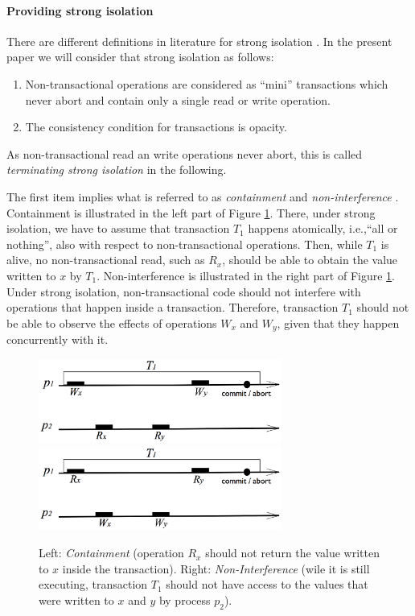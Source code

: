 \documentclass[11pt,letterpaper]{article}
\begin{document}
\paragraph{Providing strong isolation}
There  are different  definitions in  literature for  strong 
isolation \cite{blundell06, harris06, maessen07}.  
In the present  paper we  will consider that strong isolation as  follows:  
\begin{enumerate}
\vspace{-0.1cm}
\item   Non-transactional   operations   are   considered   as ``mini''
transactions which never abort and  contain only a single  read or 
write operation. 
\vspace{-0.2cm}
\item The consistency condition for transactions is opacity.
\end{enumerate}
As non-transactional read an write operations never abort, 
this is called {\it terminating strong isolation} in the following.





The  first   item   implies   what   is  referred  to  as  
{\it containment}  and
{\it non-interference} \cite{blundell06}.  
Containment is   illustrated in  the  left  part of  Figure
\ref{fig:int-nonc}.  There,
under strong  isolation, we have  to assume that transaction  $T_1$ happens
atomically,  
i.e.,``all  or  nothing'',   also  with  respect  to  non-transactional
operations. Then, while $T_1$ is  alive, no non-transactional read, such as
$R_x$, should be  
able to obtain  the value written to $x$  by $T_1$. Non-interference
is  illustrated  in  the right part of Figure  \ref{fig:int-nonc}.  
Under  strong  isolation, non-transactional  
code   should  not  interfere   with  operations   that  happen   inside  a
transaction. Therefore, transaction $T_1$ should not be able to observe the
effects of  
operations $W_x$ and $W_y$, given that they happen concurrently with it. 

\begin{figure}[h]
\centerline{
     \mbox{\includegraphics[width=80mm]{imgs/non_containment.eps}}
     \mbox{\includegraphics[width=80mm]{imgs/interference.eps}}
}
\caption{Left:  {\it Containment}  (operation $R_x$  should not  return the
    value written to $x$ inside the transaction). 
Right:  {\it  Non-Interference} (wile  it is still  executing, transaction
$T_1$ should not have access to the values that were written to $x$ and $y$
by process $p_2$).} 
\label{fig:int-nonc}
\end{figure}
\end{document}
